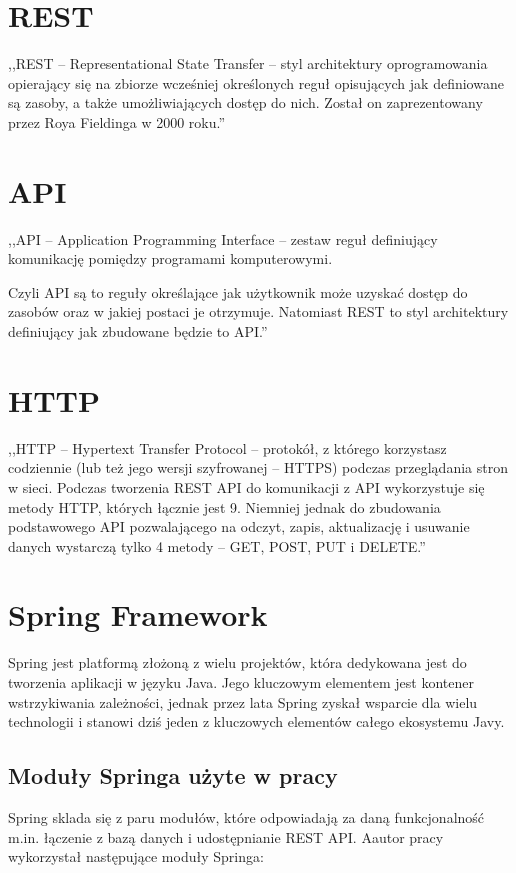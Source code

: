 \section{REST}
,,REST – Representational State Transfer – styl architektury oprogramowania opierający się na zbiorze wcześniej określonych reguł opisujących jak definiowane są zasoby, a także umożliwiających dostęp do nich. Został on zaprezentowany przez Roya Fieldinga w 2000 roku.''\cite{restApi}

\section{API}
,,API – Application Programming Interface – zestaw reguł definiujący komunikację pomiędzy programami komputerowymi.

Czyli API są to reguły określające jak użytkownik może uzyskać dostęp do zasobów oraz w jakiej postaci je otrzymuje. Natomiast REST to styl architektury definiujący jak zbudowane będzie to API.''\cite{restApi}

\section{HTTP}
,,HTTP – Hypertext Transfer Protocol – protokół, z którego korzystasz codziennie (lub też jego wersji szyfrowanej – HTTPS) podczas przeglądania stron w sieci. Podczas tworzenia REST API do komunikacji z API wykorzystuje się metody HTTP, których łącznie jest 9. Niemniej jednak do zbudowania podstawowego API pozwalającego na odczyt, zapis, aktualizację i usuwanie danych wystarczą tylko 4 metody – GET, POST, PUT i DELETE.''\cite{restApi}

\section{Spring Framework}

Spring jest platformą złożoną z wielu projektów, która dedykowana jest do tworzenia aplikacji w języku Java. Jego kluczowym elementem jest kontener wstrzykiwania zależności, jednak przez lata Spring zyskał wsparcie dla wielu technologii i stanowi dziś jeden z kluczowych elementów całego ekosystemu Javy.\cite{JavaStart-Spring}

\subsection{Moduły Springa użyte w pracy}
Spring sklada się z paru modułów, które odpowiadają za daną funkcjonalność m.in. łączenie z bazą danych i udostępnianie REST API. Aautor pracy wykorzystał następujące moduły Springa:

